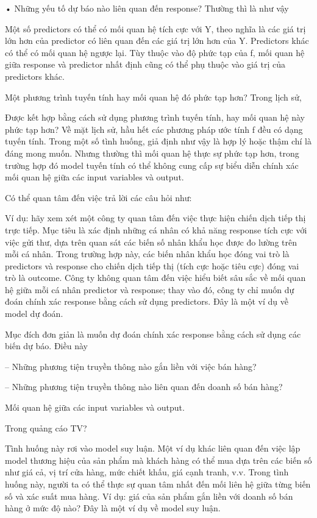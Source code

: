 • Những yếu tố dự báo nào liên quan đến response? Thường thì là như vậy

Một số predictors có thể có mối quan hệ tích cực với Y, theo nghĩa là các giá trị lớn hơn của predictor có liên quan đến các giá trị lớn hơn của Y. Predictors khác có thể có mối quan hệ ngược lại. Tùy thuộc vào độ phức tạp của f, mối quan hệ giữa response và predictor nhất định cũng có thể phụ thuộc vào giá trị của predictors khác.

Một phương trình tuyến tính hay mối quan hệ đó phức tạp hơn? Trong lịch sử,

Được kết hợp bằng cách sử dụng phương trình tuyến tính, hay mối quan hệ này phức tạp hơn? Về mặt lịch sử, hầu hết các phương pháp ước tính f đều có dạng tuyến tính. Trong một số tình huống, giả định như vậy là hợp lý hoặc thậm chí là đáng mong muốn. Nhưng thường thì mối quan hệ thực sự phức tạp hơn, trong trường hợp đó model tuyến tính có thể không cung cấp sự biểu diễn chính xác mối quan hệ giữa các input variables và output.

Có thể quan tâm đến việc trả lời các câu hỏi như:

Ví dụ: hãy xem xét một công ty quan tâm đến việc thực hiện chiến dịch tiếp thị trực tiếp. Mục tiêu là xác định những cá nhân có khả năng response tích cực với việc gửi thư, dựa trên quan sát các biến số nhân khẩu học được đo lường trên mỗi cá nhân. Trong trường hợp này, các biến nhân khẩu học đóng vai trò là predictors và response cho chiến dịch tiếp thị (tích cực hoặc tiêu cực) đóng vai trò là outcome. Công ty không quan tâm đến việc hiểu biết sâu sắc về mối quan hệ giữa mỗi cá nhân predictor và response; thay vào đó, công ty chỉ muốn dự đoán chính xác response bằng cách sử dụng predictors. Đây là một ví dụ về model dự đoán.

Mục đích đơn giản là muốn dự đoán chính xác response bằng cách sử dụng các biến dự báo. Điều này

– Những phương tiện truyền thông nào gắn liền với việc bán hàng?

– Những phương tiện truyền thông nào liên quan đến doanh số bán hàng?

Mối quan hệ giữa các input variables và output.

Trong quảng cáo TV?

Tình huống này rơi vào model suy luận. Một ví dụ khác liên quan đến việc lập model thương hiệu của sản phẩm mà khách hàng có thể mua dựa trên các biến số như giá cả, vị trí cửa hàng, mức chiết khấu, giá cạnh tranh, v.v. Trong tình huống này, người ta có thể thực sự quan tâm nhất đến mối liên hệ giữa từng biến số và xác suất mua hàng. Ví dụ: giá của sản phẩm gắn liền với doanh số bán hàng ở mức độ nào? Đây là một ví dụ về model suy luận.

